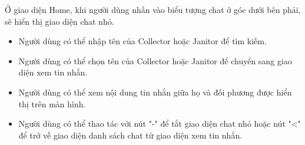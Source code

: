 \documentclass[a4paper]{article}
\begin{document}
\begin{enumerate}
    Ở giao diện Home, khi người dùng nhấn vào biểu tượng chat ở góc dưới bên phải, sẽ hiển thị giao diện chat nhỏ.
    \begin{itemize}
        \item Người dùng có thể nhập tên của Collector hoặc Janitor để tìm kiếm.
        \item Người dùng có thể chọn tên của Collector hoặc Janitor để chuyển sang giao diện xem tin nhắn.
        \item Người dùng có thể xem nội dung tin nhắn giữa họ và đối phương được hiển thị trên màn hình.
        \item Người dùng có thể thao tác với nút "-" để tắt giao diện chat nhỏ hoặc nút "<" để trở về giao diện danh sách chat từ giao diện xem tin nhắn.
    \end{itemize}
        \\
    \newpage


\end{enumerate}
\end{document}
